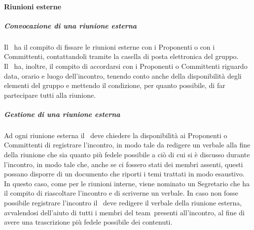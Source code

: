 \documentclass[../NormeProgetto.tex]{subfiles}
\begin{document}
			\paragraph{Riunioni esterne}
			\subparagraph{Convocazione di una riunione esterna}
			Il \responsabilediprogetto\ ha il compito di fissare le riunioni esterne con i Proponenti o con i Committenti, contattandoli tramite la casella di posta elettronica del gruppo.\\ Il \responsabilediprogetto\ ha, inoltre, il compito di accordarsi con i Proponenti o Committenti riguardo data, orario e luogo dell'incontro, tenendo conto anche della disponibilità degli elementi del gruppo e mettendo il condizione, per quanto possibile, di far partecipare tutti alla riunione.
			\subparagraph{Gestione di una riunione esterna}
			Ad ogni riunione esterna il \responsabilediprogetto\ deve chiedere la disponibilità ai Proponenti o Committenti di registrare l'incontro, in modo tale da redigere un verbale alla fine della riunione che sia quanto più fedele possibile a ciò di cui si è discusso durante l'incontro, in modo tale che, anche se ci fossero stati dei membri assenti, questi possano disporre di un documento che riporti i temi trattati in modo esaustivo. In questo caso, come per le riunioni interne, viene nominato un Segretario che ha il compito di riascoltare l'incontro e di scriverne un verbale. In caso non fosse possibile registrare l'incontro il \responsabilediprogetto\ deve redigere il verbale della riunione esterna, avvalendosi dell'aiuto di tutti i membri del team\g\ presenti all'incontro, al fine di avere una trascrizione più fedele possibile dei contenuti.
\end{document}

